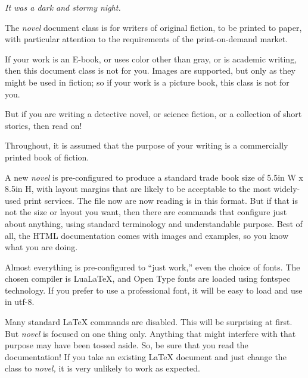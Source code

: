\documentclass{novel} %
\begin{document}
\begin{ChapterStart}[14]
\vspace{2\nbs} %
\null
{}
\vspace{2.5\nbs}
\null
{\centering\textit{It was a dark and stormy night.}\par}
\end{ChapterStart}

The \emph{novel} document class is for writers of original fiction, to be
printed to paper, with particular attention to the requirements of
the print-on-demand market.

If your work is an E-book, or uses color other than gray, or is
academic writing, then this document class is not for you. Images
are supported, but only as they might be used in fiction; so if your
work is a picture book, this class is not for you.

But if you are writing a detective novel, or science fiction, or a
collection of short stories, then read on!


Throughout, it is assumed that the purpose of your writing is a
commercially printed book of fiction.

A new \emph{novel} is pre-configured to produce a standard trade book
size of 5.5in W x 8.5in H, with layout margins that are likely to be
acceptable to the most widely-used print services. The file now are
now reading is in this format. But if that is not the size or layout you
want, then there are commands that configure just about anything,
using standard terminology and understandable purpose. Best of
all, the HTML documentation comes with images and examples, so
you know what you are doing.

Almost everything is pre-configured to “just work,” even the
choice of fonts. The chosen compiler is LuaLaTeX, and Open Type
fonts are loaded using fontspec technology. If you prefer to use 
a professional font, it will be easy to load and use in utf-8.

Many standard LaTeX commands are disabled. This will be surprising
at first. But \emph{novel} is focused on one thing only. Anything
that might interfere with that purpose may have been tossed aside.
So, be sure that you read the documentation! If you take an existing
LaTeX document and just change the class to \emph{novel,} it is very
unlikely to work as expected.
\end{document}
